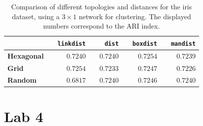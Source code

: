 \documentclass[a4paper, 10pt]{article}
\begin{document}
  \begin{table}[h]
    \centering
    \begin{tabular}{@{}llrrrrrrr@{}}
      \toprule
      & \phantom{ab}  & \texttt{linkdist} & \phantom{ab} & \texttt{dist} & 
      \phantom{ab} & \texttt{boxdist} & \phantom{ab} & \texttt{mandist} \\
      \midrule
      \textbf{Hexagonal} &&  $0.7240$  &&   $0.7240$  &&   $0.7254$  &&  $0.7239$\\
      \textbf{Grid}      &&  $0.7254$  &&   $0.7233$  &&   $0.7247$  &&  $0.7226$\\
      \textbf{Random}    &&  $0.6817$  &&   $0.7240$  &&   $0.7246$  &&  $0.7240$\\
      \bottomrule
    \end{tabular} 
    \caption{Comparison of different topologies and distances for the iris dataset,
    using a $3 \times 1$ network for clustering. The displayed numbers correspond 
  to the ARI index.}
    \label{tab:l3_som_grid}
  \end{table}

  \section{Lab 4}
\end{document}
